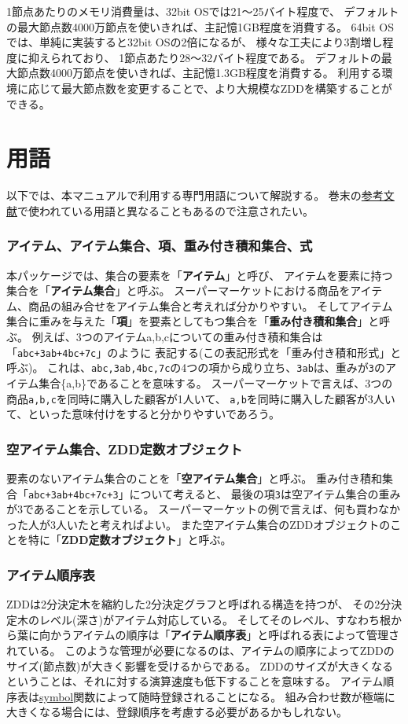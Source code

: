 1節点あたりのメモリ消費量は、32bit OSでは21～25バイト程度で、
デフォルトの最大節点数4000万節点を使いきれば、主記憶1GB程度を消費する。
64bit OSでは、単純に実装すると32bit OSの2倍になるが、
様々な工夫により3割増し程度に抑えられており、
1節点あたり28～32バイト程度である。
デフォルトの最大節点数4000万節点を使いきれば、主記憶1.3GB程度を消費する。
利用する環境に応じて最大節点数を変更することで、より大規模なZDDを構築することができる。

\section{用語\label{sect:terminology}}
以下では、本マニュアルで利用する専門用語について解説する。
巻末の\hyperref[sect:bib]{参考文献}で使われている用語と異なることもあるので注意されたい。

\subsubsection*{アイテム、アイテム集合、項、重み付き積和集合、式}
本パッケージでは、集合の要素を「{\bf アイテム}」と呼び、
アイテムを要素に持つ集合を「{\bf アイテム集合}」と呼ぶ。
スーパーマーケットにおける商品をアイテム、商品の組み合せをアイテム集合と考えれば分かりやすい。
そしてアイテム集合に重みを与えた「{\bf 項}」を要素としてもつ集合を「{\bf 重み付き積和集合}」と呼ぶ。
例えば、3つのアイテムa,b,cについての重み付き積和集合は「\verb|abc+3ab+4bc+7c|」のように
表記する(この表記形式を「重み付き積和形式」と呼ぶ)。
これは、\verb|abc,3ab,4bc,7c|の4つの項から成り立ち、\verb|3ab|は、重みが\verb|3|のアイテム集合\{a,b\}であることを意味する。
スーパーマーケットで言えば、3つの商品\verb|a,b,c|を同時に購入した顧客が1人いて、
\verb|a,b|を同時に購入した顧客が3人いて、といった意味付けをすると分かりやすいであろう。

\subsubsection*{空アイテム集合、ZDD定数オブジェクト}
要素のないアイテム集合のことを「{\bf 空アイテム集合}」と呼ぶ。
重み付き積和集合「\verb|abc+3ab+4bc+7c+3|」について考えると、
最後の項\verb|3|は空アイテム集合の重みが3であることを示している。
スーパーマーケットの例で言えば、何も買わなかった人が3人いたと考えればよい。
また空アイテム集合のZDDオブジェクトのことを特に「{\bf ZDD定数オブジェクト}」と呼ぶ。

\subsubsection*{アイテム順序表}
ZDDは2分決定木を縮約した2分決定グラフと呼ばれる構造を持つが、
その2分決定木のレベル(深さ)がアイテム対応している。
そしてそのレベル、すなわち根から葉に向かうアイテムの順序は「{\bf アイテム順序表}」と呼ばれる表によって管理されている。
このような管理が必要になるのは、アイテムの順序によってZDDのサイズ(節点数)が大きく影響を受けるからである。
ZDDのサイズが大きくなるということは、それに対する演算速度も低下することを意味する。
アイテム順序表は\hyperref[sect:symbol]{symbol}関数によって随時登録されることになる。
組み合わせ数が極端に大きくなる場合には、登録順序を考慮する必要があるかもしれない。


